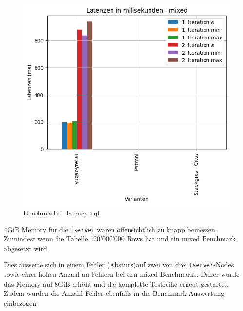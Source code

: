 \begin{flushleft}
    \begin{figure}[H]
        \centering
        \includegraphics[width=1\linewidth]{source/pandas_data_chart_plotter/latency_dql}
        \caption{Benchmarks - latency dql}
        \label{fig:latency_dql}
    \end{figure}
\end{flushleft}
\begin{flushleft}
    \begin{warning}
        4GiB Memory für die \texttt{tserver} waren offensichtlich zu knapp bemessen.
        Zumindest wenn die Tabelle 120'000'000 Rows hat und ein mixed Benchmark abgesetzt wird.

        Dies äusserte sich in einem Fehler (Absturz)auf zwei von drei \texttt{tserver}-Nodes sowie einer hohen Anzahl an Fehlern bei den mixed-Benchmarks.
        Daher wurde das Memory auf 8GiB erhöht und die komplette Testreihe erneut gestartet.
        Zudem wurden die Anzahl Fehler ebenfalls in die Benchmark-Auswertung einbezogen.
    \end{warning}
\end{flushleft}
